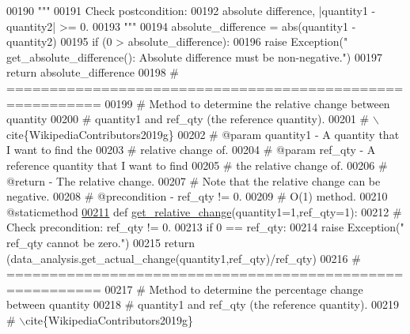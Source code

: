 \begin{DoxyCode}
{00190         \textcolor{stringliteral}{"""}
00191 \textcolor{stringliteral}{            Check postcondition:}
00192 \textcolor{stringliteral}{                absolute difference, |quantity1 - quantity2| >= 0.}
00193 \textcolor{stringliteral}{        """}
00194         absolute\_difference = abs(quantity1 - quantity2)
00195         \textcolor{keywordflow}{if} (0 > absolute\_difference):
00196             \textcolor{keywordflow}{raise} Exception(\textcolor{stringliteral}{"   get\_absolute\_difference(): Absolute difference must be non-negative."})
00197         \textcolor{keywordflow}{return} absolute\_difference
00198     \textcolor{comment}{# =========================================================}
00199     \textcolor{comment}{#   Method to determine the relative change between quantity}
00200     \textcolor{comment}{#       quantity1 and ref\_qty (the reference quantity).}
00201     \textcolor{comment}{#   \(\backslash\)cite\{WikipediaContributors2019g\}}
00202     \textcolor{comment}{#   @param quantity1 - A quantity that I want to find the}
00203     \textcolor{comment}{#       relative change of.}
00204     \textcolor{comment}{#   @param ref\_qty - A reference quantity that I want to find}
00205     \textcolor{comment}{#       the relative change of.}
00206     \textcolor{comment}{#   @return - The relative change.}
00207     \textcolor{comment}{#   Note that the relative change can be negative.}
00208     \textcolor{comment}{#   @precondition - ref\_qty != 0.}
00209     \textcolor{comment}{#   O(1) method.}
00210     @staticmethod
\hypertarget{data__analysis__tool_8py_source_l00211}{}\hyperlink{classstatistics_1_1data__analysis__tool_1_1data__analysis_a9a050987fc4c731a48d99a8db1e28c8c}{00211}     \textcolor{keyword}{def }\hyperlink{classstatistics_1_1data__analysis__tool_1_1data__analysis_a9a050987fc4c731a48d99a8db1e28c8c}{get\_relative\_change}(quantity1=1,ref\_qty=1):
00212         \textcolor{comment}{# Check precondition: ref\_qty != 0.}
00213         \textcolor{keywordflow}{if} 0 == ref\_qty:
00214             \textcolor{keywordflow}{raise} Exception(\textcolor{stringliteral}{"   ref\_qty cannot be zero."})
00215         \textcolor{keywordflow}{return} (data\_analysis.get\_actual\_change(quantity1,ref\_qty)/ref\_qty)
00216     \textcolor{comment}{# =========================================================}
00217     \textcolor{comment}{#   Method to determine the percentage change between quantity}
00218     \textcolor{comment}{#       quantity1 and ref\_qty (the reference quantity).}
00219     \textcolor{comment}{#   \(\backslash\)cite\{WikipediaContributors2019g\}}
}
\end{DoxyCode}
